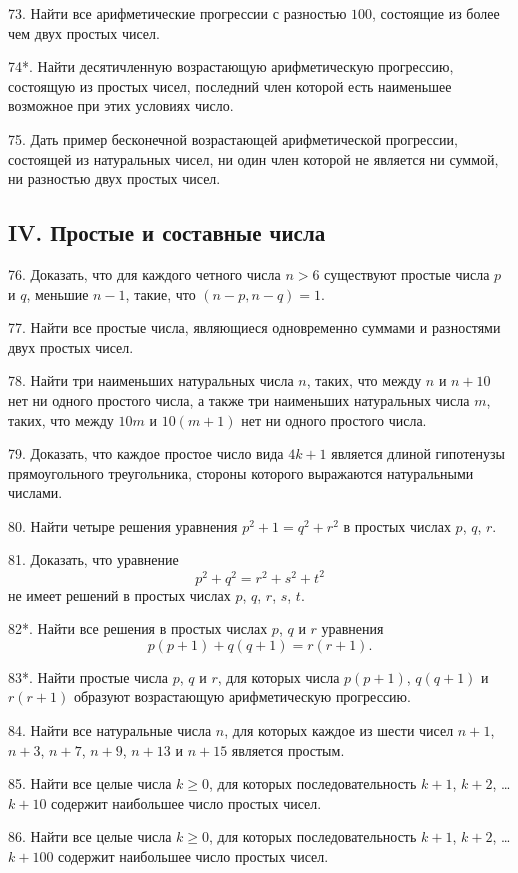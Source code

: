 \documentclass[12pt, a4paper, openany]{book}
\begin{document}
73. Найти все арифметические прогрессии с разностью $100$, состоящие из более чем двух простых чисел.

74*. Найти десятичленную возрастающую арифметическую прогрессию, состоящую из простых чисел, последний член которой есть наименьшее возможное при этих условиях число.

75. Дать пример бесконечной возрастающей арифметической прогрессии, состоящей из натуральных чисел, ни один член которой не является ни суммой, ни разностью двух простых чисел.

\subsection[IV. Простые и составные числа (76-141)]{\center IV. Простые и составные числа}

76. Доказать, что для каждого четного числа $n>6$ существуют простые числа $p$ и $q$, меньшие $n-1$, такие, что $(n-p, n-q)=1$.

77. Найти все простые числа, являющиеся одновременно суммами и разностями двух простых чисел.

78. Найти три наименьших натуральных числа $n$, таких, что между $n$ и $n+10$ нет ни одного простого числа, а также три наименьших натуральных числа $m$, таких, что между $10m$ и $10(m+1)$ нет ни одного простого числа.

79. Доказать, что каждое простое число вида $4k+1$ является длиной гипотенузы прямоугольного треугольника, стороны которого выражаются натуральными числами.

80. Найти четыре решения уравнения $p^2+1 = q^2 + r^2$ в простых числах $p$, $q$, $r$.

81. Доказать, что уравнение
	$$
	p^2 + q^2 = r^2 + s^2 + t^2
	$$
не имеет решений в простых числах $p$, $q$, $r$, $s$, $t$.

82*. Найти все решения в простых числах $p$, $q$ и $r$ уравнения
	$$
	p(p+1)+q(q+1)=r(r+1).
	$$

83*. Найти простые числа $p$, $q$ и $r$, для которых числа $p(p+1)$, $q(q+1)$ и $r(r+1)$ образуют возрастающую арифметическую прогрессию.

84. Найти все натуральные числа $n$, для которых каждое из шести чисел $n+1$, $n+3$, $n+7$, $n+9$, $n+13$ и $n+15$ является простым.

85. Найти все целые числа $k \geqslant  0$, для которых последовательность $k+1$, $k+2$, \ldots $k+10$ содержит наибольшее число простых чисел.

86. Найти все целые числа $k \geqslant  0$, для которых последовательность $k+1$, $k+2$, \ldots $k+100$ содержит наибольшее число простых чисел.
\end{document}
